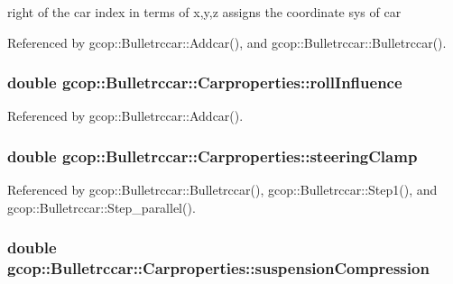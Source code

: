 right of the car index in terms of x,y,z assigns the coordinate sys of car 



\-Referenced by gcop\-::\-Bulletrccar\-::\-Addcar(), and gcop\-::\-Bulletrccar\-::\-Bulletrccar().

\subsubsection[{roll\-Influence}]{\setlength{\rightskip}{0pt plus 5cm}double {\bf gcop\-::\-Bulletrccar\-::\-Carproperties\-::roll\-Influence}}\label{structgcop_1_1Bulletrccar_1_1Carproperties_acd8a5a7157bc7c120008a6b084e2f82e}


\-Referenced by gcop\-::\-Bulletrccar\-::\-Addcar().

\subsubsection[{steering\-Clamp}]{\setlength{\rightskip}{0pt plus 5cm}double {\bf gcop\-::\-Bulletrccar\-::\-Carproperties\-::steering\-Clamp}}\label{structgcop_1_1Bulletrccar_1_1Carproperties_aaea821fdeb3d4d35e266b9ebd183fc87}


\-Referenced by gcop\-::\-Bulletrccar\-::\-Bulletrccar(), gcop\-::\-Bulletrccar\-::\-Step1(), and gcop\-::\-Bulletrccar\-::\-Step\-\_\-parallel().

\subsubsection[{suspension\-Compression}]{\setlength{\rightskip}{0pt plus 5cm}double {\bf gcop\-::\-Bulletrccar\-::\-Carproperties\-::suspension\-Compression}}\label{structgcop_1_1Bulletrccar_1_1Carproperties_a516c654c8143413bfd2c1fac78a59b1e}


